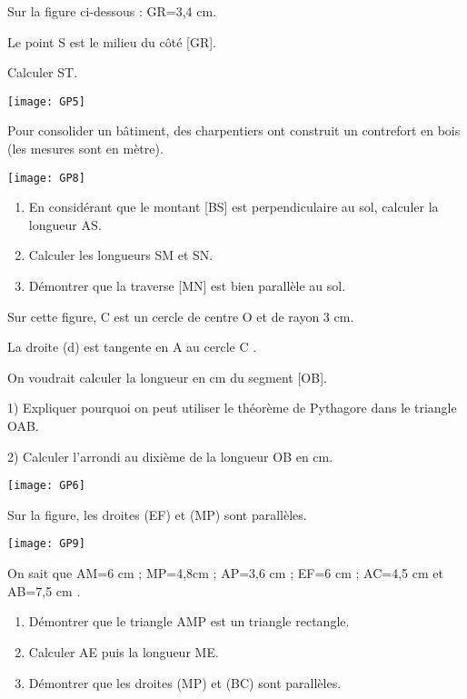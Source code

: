 
\begin{exercice}[]
Sur la figure ci-dessous : GR=3,4 cm. 

Le point S est le milieu du côté [GR]. 

Calculer ST. 
\begin{center}
\texttt{[image: GP5]}
\end{center}
\end{exercice}

\begin{exercice}[]
Pour consolider un bâtiment, des charpentiers  ont construit un contrefort en bois (les mesures sont en mètre).

\begin{center}
\texttt{[image: GP8]}
\end{center}

\begin{enumerate}
\item En considérant que le montant [BS] est perpendiculaire au sol, calculer la longueur AS.
\item Calculer les longueurs SM et SN.
\item Démontrer que la traverse [MN] est bien parallèle au sol.
\end{enumerate}
\end{exercice}

\begin{exercice}[]
Sur cette figure, C est un cercle de centre O et de rayon 3 cm.

La droite (d) est tangente en A au cercle C .

On voudrait calculer la longueur en cm du segment [OB].

1) Expliquer pourquoi on peut utiliser le théorème de Pythagore dans le triangle OAB.

2) Calculer l’arrondi au dixième de la longueur OB en cm.
\begin{center}
\texttt{[image: GP6]}
\end{center}
\end{exercice}

\begin{exercice}[]
Sur la figure, les droites (EF) et (MP) sont parallèles.
\begin{center}
\texttt{[image: GP9]}
\end{center}

On sait que AM=6 cm ; MP=4,8cm ; AP=3,6 cm ; EF=6 cm ; AC=4,5 cm et AB=7,5 cm .

\begin{enumerate}
\item Démontrer que le triangle AMP est un triangle rectangle.
\item Calculer AE puis la longueur ME.
\item Démontrer que les droites (MP) et (BC) sont parallèles.
\end{enumerate}
\end{exercice}



